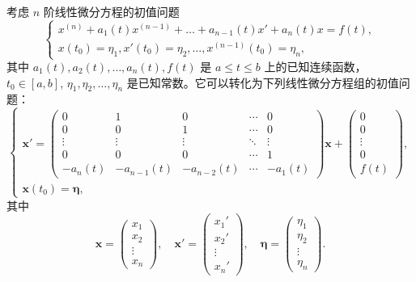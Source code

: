 \begin{proposition}[初值问题的等价性]\label{prop:初值问题的等价性}
    考虑 $n$ 阶线性微分方程的初值问题
\begin{equation}
\begin{cases}
x^{(n)}+a_1(t)x^{(n-1)}+\dots+a_{n-1}(t)x'+a_n(t)x=f(t), \\
x(t_0)=\eta_1, x'(t_0)=\eta_2, \dots, x^{(n-1)}(t_0)=\eta_n,
\end{cases} \label{eq:nth_order_initial_value_problem}
\end{equation}
其中 $a_1(t), a_2(t), \dots, a_n(t), f(t)$ 是 $a \le t \le b$ 上的已知连续函数，$t_0 \in [a,b]$, $\eta_1, \eta_2, \dots,
\eta_n$ 是已知常数。它可以转化为下列线性微分方程组的初值问题：
\begin{equation}
\begin{cases}
\mathbf{x}' = \begin{pmatrix}
0 & 1 & 0 & \cdots & 0 \\
0 & 0 & 1 & \cdots & 0 \\
\vdots & \vdots & \vdots & \ddots & \vdots \\
0 & 0 & 0 & \cdots & 1 \\
-a_n(t) & -a_{n-1}(t) & -a_{n-2}(t) & \cdots & -a_1(t)
\end{pmatrix}\mathbf{x} + \begin{pmatrix}
0 \\ 0 \\ \vdots \\ 0 \\ f(t)
\end{pmatrix}, \\
\mathbf{x}(t_0) = \boldsymbol{\eta},
\end{cases} \label{eq:system_initial_value_problem}
\end{equation}
其中
$$\mathbf{x} = \begin{pmatrix} x_1 \\ x_2 \\ \vdots \\ x_n \end{pmatrix}, \quad \mathbf{x}' = \begin{pmatrix} x_1' \\ x_2' \\ \vdots \\ x_n' \end{pmatrix}, \quad \boldsymbol{\eta} = \begin{pmatrix} \eta_1 \\ \eta_2 \\ \vdots \\ \eta_n \end{pmatrix}.$$
\end{proposition}
